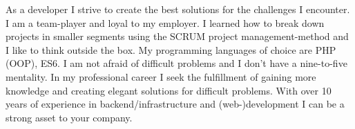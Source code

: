 

\begin{cvparagraph}

As a developer I strive to create the best solutions for the challenges I encounter. I am a team-player and loyal to my employer. I learned how to break down projects in smaller segments using the SCRUM project management-method and I like to think outside the box. My programming languages of choice are PHP (OOP), ES6. I am not afraid of difficult problems and I don't have a nine-to-five mentality. In my professional career I seek the fulfillment of gaining more knowledge and creating elegant solutions for difficult problems. With over 10 years of experience in backend/infrastructure and (web-)development I can be a strong asset to your company.
\end{cvparagraph}
